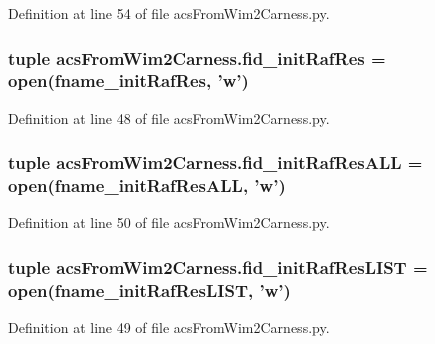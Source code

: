 Definition at line 54 of file acs\-From\-Wim2\-Carness.\-py.

\hypertarget{a00094_a2f9cfe05abfed3ab6326d0cb094c7c80}{
\subsubsection[{fid\-\_\-init\-Raf\-Res}]{\setlength{\rightskip}{0pt plus 5cm}tuple acs\-From\-Wim2\-Carness.\-fid\-\_\-init\-Raf\-Res = open({\bf fname\-\_\-init\-Raf\-Res}, 'w')}}\label{a00094_a2f9cfe05abfed3ab6326d0cb094c7c80}


Definition at line 48 of file acs\-From\-Wim2\-Carness.\-py.

\hypertarget{a00094_add1c3bb75f1d98889c27099fc14fc6a8}{
\subsubsection[{fid\-\_\-init\-Raf\-Res\-A\-L\-L}]{\setlength{\rightskip}{0pt plus 5cm}tuple acs\-From\-Wim2\-Carness.\-fid\-\_\-init\-Raf\-Res\-A\-L\-L = open({\bf fname\-\_\-init\-Raf\-Res\-A\-L\-L}, 'w')}}\label{a00094_add1c3bb75f1d98889c27099fc14fc6a8}


Definition at line 50 of file acs\-From\-Wim2\-Carness.\-py.

\hypertarget{a00094_a7af2668de12720f3c7925527002d81b0}{
\subsubsection[{fid\-\_\-init\-Raf\-Res\-L\-I\-S\-T}]{\setlength{\rightskip}{0pt plus 5cm}tuple acs\-From\-Wim2\-Carness.\-fid\-\_\-init\-Raf\-Res\-L\-I\-S\-T = open({\bf fname\-\_\-init\-Raf\-Res\-L\-I\-S\-T}, 'w')}}\label{a00094_a7af2668de12720f3c7925527002d81b0}


Definition at line 49 of file acs\-From\-Wim2\-Carness.\-py.


